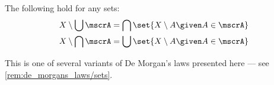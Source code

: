 \begin{theorem}\label{thm:de_morgans_laws_for_sets}
  The following hold for any sets:
  \begin{align}
    X \setminus \bigcup \mscrA = \bigcap \set{ X \setminus A \given A \in \mscrA } \label{eq:thm:de_morgans_laws_for_sets/complement_of_union} \\
    X \setminus \bigcap \mscrA = \bigcup \set{ X \setminus A \given A \in \mscrA } \label{eq:thm:de_morgans_laws_for_sets/complement_of_intersection}
  \end{align}
\end{theorem}
\begin{comments}
  \item This is one of several variants of De Morgan's laws presented here --- see \cref{rem:de_morgans_laws/sets}.
\end{comments}
